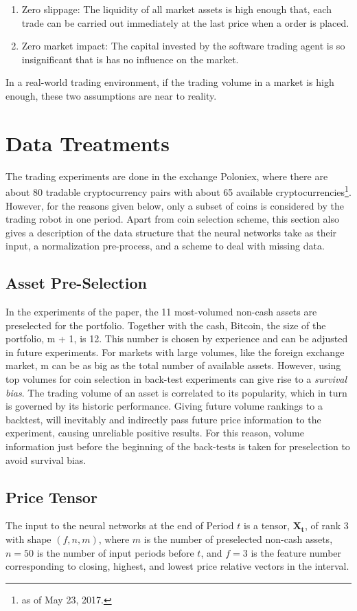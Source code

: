 \documentclass[journal,onecolumn]{IEEEtran}
\newcommand{\vc}[1]{\mathbf{#1}}
\begin{document}
\begin{enumerate}
	\item Zero slippage: The liquidity of all market assets is high enough that, each trade can
	be carried out immediately at the last price when a order is placed.
	\item Zero market impact: The capital invested by the software trading agent is so insignificant
	that is has no influence on the market.
\end{enumerate}

In a real-world trading environment, if the trading volume in a market is high enough, these two assumptions are near to reality.

\section{Data Treatments}
The trading experiments are done in the exchange Poloniex, where there are about 80 tradable cryptocurrency pairs with about 65 available cryptocurrencies\footnote{as of May 23, 2017.}. However, for the
reasons given below, only a subset of coins is considered by the trading robot in one period.
Apart from coin selection scheme, this section also gives a description of the data structure that the neural networks take as their input, a normalization pre-process, and a scheme to
deal with missing data.

\subsection{Asset Pre-Selection}
In the experiments of the paper, the 11 most-volumed non-cash assets are preselected for the portfolio. Together with the cash, Bitcoin, the size of the portfolio, m + 1, is 12. This number is chosen by experience and can be adjusted in future experiments. For markets with large volumes, like the foreign exchange market, m can be as big as the total number of available assets.
However, using top volumes for coin selection in back-test experiments can give rise to a \textit{survival bias}. The trading volume of an asset is correlated to its popularity, which in turn is governed by its historic performance. Giving future volume rankings to a backtest, will inevitably and indirectly pass future price information to the experiment, causing unreliable positive results. For this reason, volume information just before the beginning of the back-tests is taken for preselection to avoid survival bias.

\subsection{Price Tensor}
The input to the neural networks at the end of Period $t$ is a tensor, $\vc{X_t}$, of rank 3 with shape $(f, n, m)$, where $m$ is the number of preselected non-cash assets, $n = 50$ is the number of
input periods before $t$, and $f = 3$ is the feature number corresponding to closing, highest, and lowest price relative vectors in
the interval.	
\end{document}
